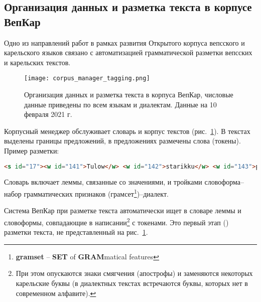 
\subsection{Организация данных и разметка текста в корпусе ВепКар} \label{sect_exp_tag_vepkar_data_org}

Одно из направлений работ в рамках развития Открытого корпуса вепсского и карельского языков связано с автоматизацией грамматической разметки вепсских и карельских текстов. 

\begin{figure}
    \centering
    \texttt{[image: corpus\_manager\_tagging.png]}
\caption[Организация данных и разметка текста в корпуса ВепКар]{Организация 
данных и разметка текста в корпуса ВепКар, 
числовые данные приведены по всем языкам и диалектам. Данные на 10 февраля 2021 г.} \label{fig:corpus_manager_tagging}
\end{figure}

Корпусный менеджер обслуживает  словарь и корпус текстов 
(рис.~\ref{fig:corpus_manager_tagging}). 
В текстах выделены границы предложений, в предложениях размечены слова (токены). 
Пример разметки:
\begin{lstlisting}[language=HTML]
<s id="17"><w id="141">Tulow</w> <w id="142">starikku</w> <w id="143">pertih</w>, <w id="144">tuattah</w> <w id="145">se</w>.</s>
\end{lstlisting}

Словарь включает леммы, связанные со значениями, и тройками словоформа--набор грамматических признаков (грамсет\footnote{ \textbf{gramset} -- \textbf{SET} of \textbf{GRAM}matical features})--диалект. 

Система ВепКар при разметке текста автоматически ищет в словаре 
леммы и словоформы, 
совпадающие в написании\footnote{При этом опускаются знаки смягчения (апострофы) 
и заменяются некоторых карельские буквы (в диалектных текстах встречаются буквы, 
которых нет в современном алфавите).
} 
с токенами. 
Это первый этап () разметки текста, не представленный на рис.~\ref{fig:corpus_manager_tagging}.  

